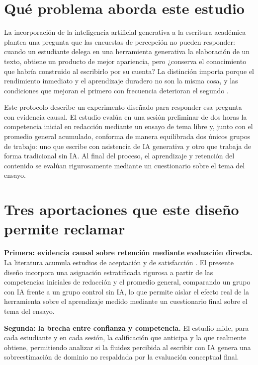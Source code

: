 \documentclass[12pt,a4paper,openany]{report}
\begin{document}
    \section{Qu\'e problema aborda este estudio}
    
    La incorporaci\'on de la inteligencia artificial generativa a la escritura acad\'emica plantea una pregunta que las encuestas de percepci\'on no pueden responder: cuando un estudiante delega en una herramienta generativa la elaboraci\'on de un texto, obtiene un producto de mejor apariencia, pero ¿conserva el conocimiento que habr\'ia construido al escribirlo por su cuenta? La distinci\'on importa porque el rendimiento inmediato y el aprendizaje duradero no son la misma cosa, y las condiciones que mejoran el primero con frecuencia deterioran el segundo \citep{bjork2013self}.
    
    Este protocolo describe un experimento dise\~nado para responder esa pregunta con evidencia causal. El estudio eval\'ua en una sesi\'on preliminar de dos horas la competencia inicial en redacci\'on mediante un ensayo de tema libre y, junto con el promedio general acumulado, conforma de manera equilibrada dos \'unicos grupos de trabajo: uno que escribe con asistencia de IA generativa y otro que trabaja de forma tradicional sin IA. Al final del proceso, el aprendizaje y retenci\'on del contenido se eval\'uan rigurosamente mediante un cuestionario sobre el tema del ensayo.
    
    \section{Tres aportaciones que este dise\~no permite reclamar}
    
    \textbf{Primera: evidencia causal sobre retenci\'on mediante evaluaci\'on directa.} La literatura acumula estudios de aceptaci\'on y de satisfacci\'on \citep{deng2024chatgpt}. El presente dise\~no incorpora una asignaci\'on estratificada rigurosa a partir de las competencias iniciales de redacci\'on y el promedio general, comparando un grupo con IA frente a un grupo control sin IA, lo que permite aislar el efecto real de la herramienta sobre el aprendizaje medido mediante un cuestionario final sobre el tema del ensayo.
    
    \textbf{Segunda: la brecha entre confianza y competencia.} El estudio mide, para cada estudiante y en cada sesi\'on, la calificaci\'on que anticipa y la que realmente obtiene, permitiendo analizar si la fluidez percibida al escribir con IA genera una sobreestimaci\'on de dominio no respaldada por la evaluaci\'on conceptual final.
    
\end{document}
